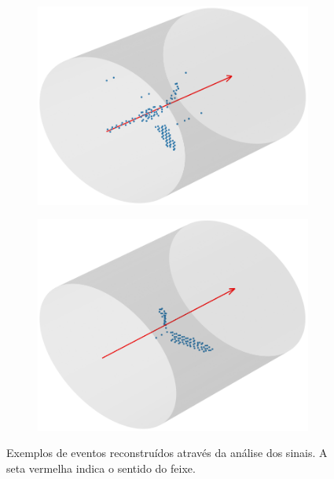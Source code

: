 \documentclass[a4paper,12pt,oneside]{book}
\begin{document}
\begin{figure}[H]
\begin{subfigure}[b]{0.48\textwidth}
        \caption{}
        \label{subfig:ex_ev_2}
    \end{subfigure}
    \begin{subfigure}[b]{0.48\textwidth}
        \centering
        \includegraphics[scale=0.38]{figs/ex_ev_3.png}
        \caption{}
        \label{subfig:ex_ev_3}
    \end{subfigure}%
    \hfill
    \begin{subfigure}[b]{0.48\textwidth}
        \centering
        \includegraphics[scale=0.38]{figs/ex_ev_4.png}
        \caption{}
        \label{subfig:ex_ev_4}
    \end{subfigure}
\caption{Exemplos de eventos reconstruídos através da análise dos sinais. A seta vermelha indica o sentido do feixe.}
\label{fig:ex_eventos}
\end{figure}
\end{document}

